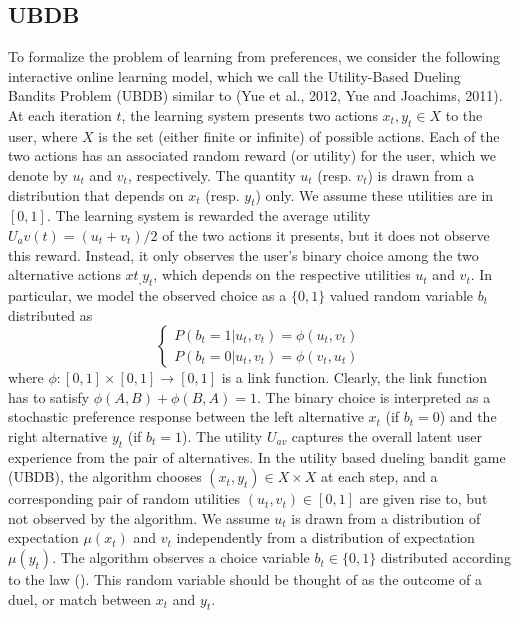 \documentclass{llncs}
\begin{document}
	\subsection{UBDB}
	To formalize the problem of learning from preferences, we consider the following interactive online learning model, which we call the Utility-Based Dueling Bandits Problem (UBDB) similar to (Yue et al., 2012, Yue and Joachims, 2011). 
		At each iteration $t$, the learning system presents two actions $x_t, y_t \in X$ to the user, where $X$ is the set (either finite or infinite) of possible actions. 
		Each of the two actions has an associated random reward (or utility) for the user, which we denote by $u_t$ and $v_t$, respectively.
		The quantity $u_t$ (resp. $v_t$) is drawn from a distribution that depends on $x_t$ (resp. $y_t$) only.  
		We assume these utilities are in $[0, 1]$. The learning system is rewarded the average utility$ U_av(t) = (u_t + v_t)/2$ of the two actions it presents, but it does not observe this reward. 
		Instead, it only observes the user’s binary choice among the two alternative actions $xt_, y_t$, which depends on the respective utilities $u_t$ and $v_t$. 
		In particular, we model the observed choice as a $\{0, 1\}$ valued random variable $b_t$ distributed as
		\begin{equation}
		\begin{cases}
		P(b_t = 1|u_t, v_t) = \phi(u_t, v_t)
		\\
		P(b_t = 0|u_t, v_t) = \phi(v_t, u_t)
		\end{cases}
		\end{equation}			
	where $\phi:[0, 1] \times [0, 1] \rightarrow [0, 1]$ is a link function. 
	Clearly, the link function has to satisfy $\phi(A, B) + \phi(B, A) = 1$.
	The binary choice is interpreted as a stochastic preference response between the left alternative $x_t$ (if $b_t = 0$) and the right alternative $y_t$ (if $b_t = 1$). 
	The utility $U_{av}$ captures the overall latent user experience from the pair of alternatives. 
	In the utility based dueling bandit game (UBDB), the algorithm chooses $(x_t, y_t) \in X \times X$ at each step, and a corresponding pair of random utilities $(u_t, v_t) \in [0, 1]$ are given rise to, but not observed by the algorithm.  
	We assume $u_t$ is drawn from a distribution of expectation $\mu(x_t)$ and $v_t$ independently from a distribution of expectation $\mu(y_t)$. 
	The algorithm observes a choice variable $b_t \in \{0, 1\}$ distributed according to the law (). 
	This random variable should be thought of as the outcome of a duel, or match between $x_t$ and $y_t$. 
\end{document}

